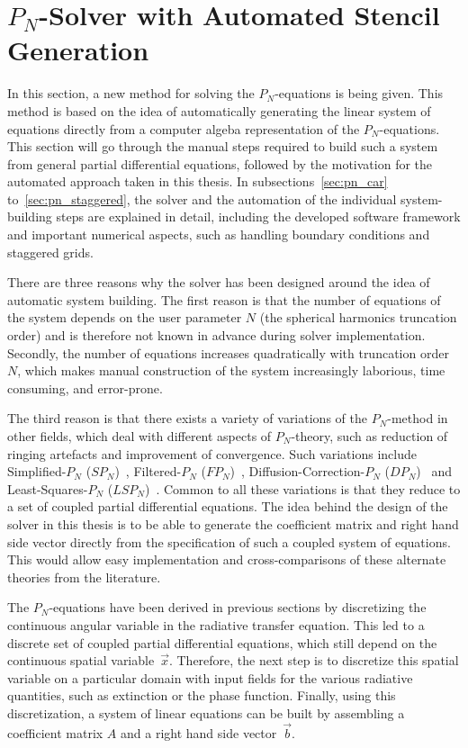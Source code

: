 \section{$P_N$-Solver with Automated Stencil Generation}
\label{sec:pn_solver}

In this section, a new method for solving the $P_N$-equations is being given. This method is based on the idea of automatically generating the linear system of equations directly from a computer algeba representation of the $P_N$-equations. This section will go through the manual steps required to build such a system from general partial differential equations, followed by the motivation for the automated approach taken in this thesis. In subsections~\ref{sec:pn_car} to~\ref{sec:pn_staggered}, the solver and the automation of the individual system-building steps are explained in detail, including the developed software framework and important numerical aspects, such as handling boundary conditions and staggered grids.

There are three reasons why the solver has been designed around the idea of automatic system building. The first reason is that the number of equations of the system depends on the user parameter $N$ (the spherical harmonics truncation order) and is therefore not known in advance during solver implementation. Secondly, the number of equations increases quadratically with truncation order $N$, which makes manual construction of the system increasingly laborious, time consuming, and error-prone.

The third reason is that there exists a variety of variations of the $P_N$-method in other fields, which deal with different aspects of $P_N$-theory, such as reduction of ringing artefacts and improvement of convergence. Such variations include Simplified-$P_N$ ($SP_N$)~\cite{Ryan10}, Filtered-$P_N$ ($FP_N$)~\cite{Radice13}, Diffusion-Correction-$P_N$ ($DP_N$)~\cite{Schaefer11} and Least-Squares-$P_N$ ($LSP_N$)~\cite{Hansen14}. Common to all these variations is that they reduce to a set of coupled partial differential equations. The idea behind the design of the solver in this thesis is to be able to generate the coefficient matrix and right hand side vector directly from the specification of such a coupled system of equations. This would allow easy implementation and cross-comparisons of these alternate theories from the literature.

The $P_N$-equations have been derived in previous sections by discretizing the continuous angular variable in the radiative transfer equation. This led to a discrete set of coupled partial differential equations, which still depend on the continuous spatial variable~$\vec{x}$. Therefore, the next step is to discretize this spatial variable on a particular domain with input fields for the various radiative quantities, such as extinction or the phase function. Finally, using this discretization, a system of linear equations can be built by assembling a coefficient matrix $A$ and a right hand side vector~$\vec{b}$.

